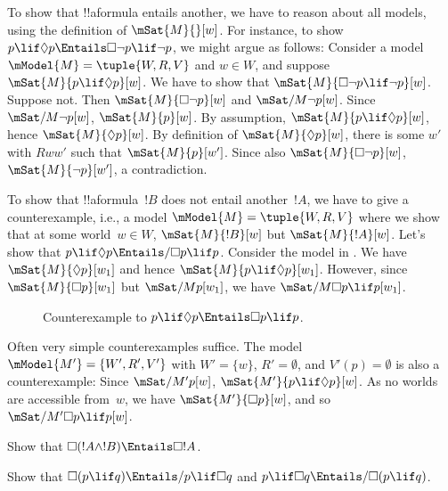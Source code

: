 \documentclass[../../../include/open-logic-section]{subfiles}
\begin{document}
\begin{ex}
  To show that !!a{formula} entails another, we have to reason about
  all models, using the definition of $\mSat{M}{}[w]$. For instance,
  to show $p \lif \Diamond p \Entails \Box\lnot p \lif \lnot p$, we
  might argue as follows: Consider a model $\mModel{M} = \tuple{W, R,
    V}$ and $w \in W$, and suppose $\mSat{M}{p \lif \Diamond
    p}[w]$. We have to show that $\mSat{M}{\Box\lnot p \lif \lnot
    p}[w]$. Suppose not. Then $\mSat{M}{\Box\lnot p}[w]$ and
  $\mSat/{M}{\lnot p}[w]$. Since $\mSat/{M}{\lnot p}[w]$, $\mSat{M}{
    p}[w]$. By assumption, $\mSat{M}{p \lif \Diamond p}[w]$, hence
  $\mSat{M}{\Diamond p}[w]$. By definition of $\mSat{M}{\Diamond
    p}[w]$, there is some $w'$ with $Rww'$ such that
  $\mSat{M}{p}[w']$. Since also $\mSat{M}{\Box \lnot p}[w]$,
  $\mSat{M}{\lnot p}[w']$, a contradiction.

  To show that !!a{formula}~$!B$ does not entail another~$!A$, we have
  to give a counterexample, i.e., a model $\mModel{M} = \tuple{W, R,
    V}$ where we show that at some world~$w \in W$, $\mSat{M}{!B}[w]$
  but $\mSat{M}{!A}[w]$. Let's show that $p \lif \Diamond p \Entails/
  \Box p \lif p$. Consider the model in .  We
  have $\mSat{M}{\Diamond p}[w_1]$ and hence $\mSat{M}{p \lif
    \Diamond p}[w_1]$. However, since $\mSat{M}{\Box p}[w_1]$ but
  $\mSat/{M}{p}[w_1]$, we have $\mSat/{M}{\Box p \lif p}[w_1]$.
  \begin{figure}
  \begin{center}
  \end{center}
\caption{Counterexample to $p \lif \Diamond p
  \Entails \Box p \lif p$.}
  \end{figure}
  
  Often very simple counterexamples suffice. The model $\mModel{M'} =
  \{W', R', V'\}$ with $W' = \{w\}$, $R' = \emptyset$, and $V'(p) =
  \emptyset$ is also a counterexample: Since $\mSat/{M'}{p}[w]$,
  $\mSat{M'}{p \lif \Diamond p}[w]$. As no worlds are accessible
  from~$w$, we have $\mSat{M'}{\Box p}[w]$, and so $\mSat/{M'}{\Box p
    \lif p}[w]$.
\end{ex}

\begin{prob}
  Show that $\Box (!A \land !B) \Entails \Box !A$.
\end{prob}

\begin{prob}
  Show that $\Box (p \lif q) \Entails/ p \lif \Box q$ and $p \lif \Box
  q \Entails/\Box (p \lif q)$.
\end{prob}
\end{document}
